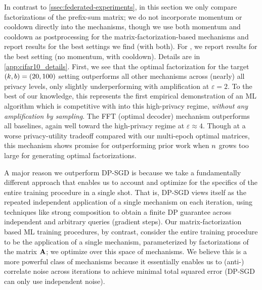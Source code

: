 \documentclass{article} %
\theoremstyle{named}
\begin{document}
In contrast to \cref{ssec:federated-experiments}, in this section we only compare factorizations of the prefix-sum matrix; we do not incorporate momentum or cooldown directly into the mechanisms, though we use both momentum and cooldown as postprocessing for the matrix-factorization-based mechanisms and report results for the best settings we find (with both). For \DPSGD, we report results for the best setting (no momentum, with cooldown). Details are in \cref{app:cifar10_details}.
 First, we see that the optimal factorization for the target $(k,b) = (20, 100)$ setting outperforms all other mechanisms across (nearly) all privacy levels, only slightly underperforming \DPSGD with amplification at $\varepsilon=2$. To the best of our knowledge, this represents the first empirical demonstration of an ML algorithm which is competitive with \DPSGD into this high-privacy regime, \emph{without any amplification by sampling}. The FFT (optimal decoder) mechanism outperforms all baselines, again well toward the high-privacy regime at $\varepsilon\approx 4$. Though at a worse privacy-utility tradeoff compared with our multi-epoch optimal matrices, this mechanism shows promise for outperforming prior work when $n$ grows too large for generating optimal factorizations.

A major reason we outperform DP-SGD is because we take a fundamentally different approach that enables us to account and optimize for the specifics of the entire training procedure in a single shot. That is, DP-SGD views itself as the repeated independent application of a single mechanism on each iteration, using techniques like strong composition to obtain a finite DP guarantee across 
 independent and arbitrary queries (gradient steps). Our matrix-factorization based ML training procedures, by contrast, consider the entire training procedure to be the application of a single mechanism, parameterized by factorizations of the matrix $\mathbf{A}$; we optimize over this space of mechanisms. We believe this is a more powerful class of mechanisms because it essentially enables us to (anti-) correlate noise across iterations to achieve minimal total squared error (DP-SGD can only use independent noise). 
\end{document}
